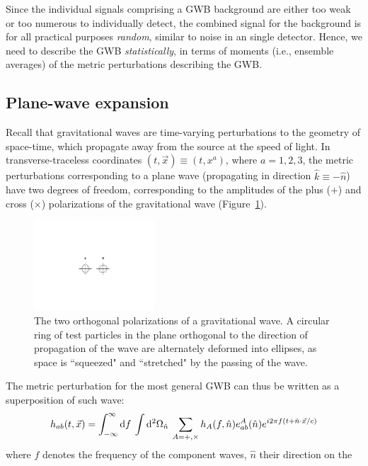 \documentclass[11pt]{article}
\numberwithin{equation}{section}
\def\be{\begin{equation}}
\def\ee{\end{equation}}
\def\D{{\rm d}}
\begin{document}
Since the individual signals comprising a GWB 
background are either too weak or too numerous to 
individually detect, the combined signal for the 
background is for all practical purposes 
{\em random}, similar to noise in an single detector.
Hence, we need to describe the GWB {\em statistically}, 
in terms of moments 
(i.e., ensemble averages) of the metric perturbations 
describing the GWB.

\subsection{Plane-wave expansion}
\label{s:plane_wave}

Recall that gravitational waves are time-varying 
perturbations to the geometry of space-time, 
which propagate away from the source at the speed 
of light.
In transverse-traceless coordinates
$(t,\vec x)\equiv (t,x^a)$, where $a=1,2,3$,
the metric perturbations corresponding to a 
plane wave (propagating in direction $\hat k\equiv-\hat n$) 
have two degrees of freedom, corresponding to the 
amplitudes of the 
plus ($+$) and cross ($\times$) polarizations of
the gravitational wave (Figure~\ref{f:polarizations}).
%
\begin{figure}[htbp!]
\begin{center}
\includegraphics[width=0.4\textwidth]{Figures/polarizations}
\caption{The two orthogonal polarizations of a gravitational wave.
A circular ring of test particles in the plane orthogonal to 
the direction of propagation of the wave are alternately deformed
into ellipses, as space is ``squeezed" and ``stretched" by the 
passing of the wave.}
\label{f:polarizations}
\end{center}
\end{figure}
%
The metric perturbation for the most general GWB 
can thus be written as a superposition of such 
wave:
%
\be
h_{ab}(t,\vec x) =
\int_{-\infty}^\infty \D f\>
\int \D^2\Omega_{\hat n}\>
\sum_{A=+,\times}
h_A(f,\hat n)e^A_{ab}(\hat n) 
e^{i2\pi f(t+\hat n\cdot \vec x/c)}
\label{e:planewave}
\ee
%
where $f$ denotes the frequency of the 
component waves, $\hat n$ their direction on the
\end{document}
